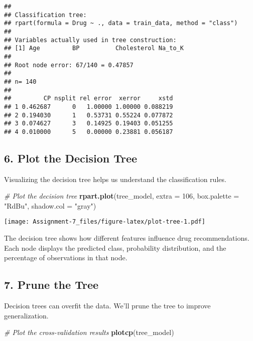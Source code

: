 \documentclass[
]{article}
\newenvironment{Shaded}{\begin{snugshade}}{\end{snugshade}}
\newcommand{\AttributeTok}[1]{\textcolor[rgb]{0.13,0.29,0.53}{#1}}
\newcommand{\CommentTok}[1]{\textcolor[rgb]{0.56,0.35,0.01}{\textit{#1}}}
\newcommand{\DecValTok}[1]{\textcolor[rgb]{0.00,0.00,0.81}{#1}}
\newcommand{\FunctionTok}[1]{\textcolor[rgb]{0.13,0.29,0.53}{\textbf{#1}}}
\newcommand{\NormalTok}[1]{#1}
\newcommand{\StringTok}[1]{\textcolor[rgb]{0.31,0.60,0.02}{#1}}
\begin{document}
\begin{verbatim}
## 
## Classification tree:
## rpart(formula = Drug ~ ., data = train_data, method = "class")
## 
## Variables actually used in tree construction:
## [1] Age         BP          Cholesterol Na_to_K    
## 
## Root node error: 67/140 = 0.47857
## 
## n= 140 
## 
##         CP nsplit rel error  xerror     xstd
## 1 0.462687      0   1.00000 1.00000 0.088219
## 2 0.194030      1   0.53731 0.55224 0.077872
## 3 0.074627      3   0.14925 0.19403 0.051255
## 4 0.010000      5   0.00000 0.23881 0.056187
\end{verbatim}

\subsection{6. Plot the Decision Tree}\label{plot-the-decision-tree}

Visualizing the decision tree helps us understand the classification
rules.

\begin{Shaded}
\begin{Highlighting}[]
\CommentTok{\# Plot the decision tree}
\FunctionTok{rpart.plot}\NormalTok{(tree\_model, }\AttributeTok{extra =} \DecValTok{106}\NormalTok{, }\AttributeTok{box.palette =} \StringTok{"RdBu"}\NormalTok{, }\AttributeTok{shadow.col =} \StringTok{"gray"}\NormalTok{)}
\end{Highlighting}
\end{Shaded}

\texttt{[image: Assignment-7\_files/figure-latex/plot-tree-1.pdf]}

The decision tree shows how different features influence drug
recommendations. Each node displays the predicted class, probability
distribution, and the percentage of observations in that node.

\subsection{7. Prune the Tree}\label{prune-the-tree}

Decision trees can overfit the data. We'll prune the tree to improve
generalization.

\begin{Shaded}
\begin{Highlighting}[]
\CommentTok{\# Plot the cross{-}validation results}
\FunctionTok{plotcp}\NormalTok{(tree\_model)}
\end{Highlighting}
\end{Shaded}
\end{document}
